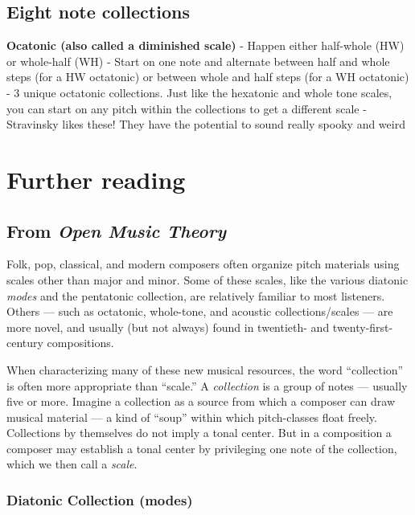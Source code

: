 \documentclass{book}
\begin{document}
\hypertarget{eight-note-collections}{%
\section{Eight note collections}\label{eight-note-collections}}

\textbf{Ocatonic (also called a diminished scale)} - Happen either half-whole
(HW) or whole-half (WH) - Start on one note and alternate between half and
whole steps (for a HW octatonic) or between whole and half steps (for a WH
octatonic) - 3 unique octatonic collections. Just like the hexatonic and whole
tone scales, you can start on any pitch within the collections to get a
different scale - Stravinsky likes these! They have the potential to sound
really spooky and weird

\hypertarget{further-reading-9}{%
\chapter{Further reading}\label{further-reading-9}}

\hypertarget{from-open-music-theory-10}{%
\section{\texorpdfstring{From \emph{Open Music
Theory}}{From Open Music Theory}}\label{from-open-music-theory-10}}

Folk, pop, classical, and modern composers often organize pitch materials
using scales other than major and minor. Some of these scales, like the
various diatonic \emph{modes} and the pentatonic collection, are relatively
familiar to most listeners. Others --- such as octatonic, whole-tone, and
acoustic collections/scales --- are more novel, and usually (but not always)
found in twentieth- and twenty-first-century compositions.

When characterizing many of these new musical resources, the word
``collection'' is often more appropriate than ``scale.'' A \emph{collection}
is a group of notes --- usually five or more. Imagine a collection as a source
from which a composer can draw musical material --- a kind of ``soup'' within
which pitch-classes float freely. Collections by themselves do not imply a
tonal center. But in a composition a composer may establish a tonal center by
privileging one note of the collection, which we then call a \emph{scale}.

\hypertarget{diatonic-collection-modes}{%
\subsection{Diatonic Collection (modes)}\label{diatonic-collection-modes}}
\end{document}

